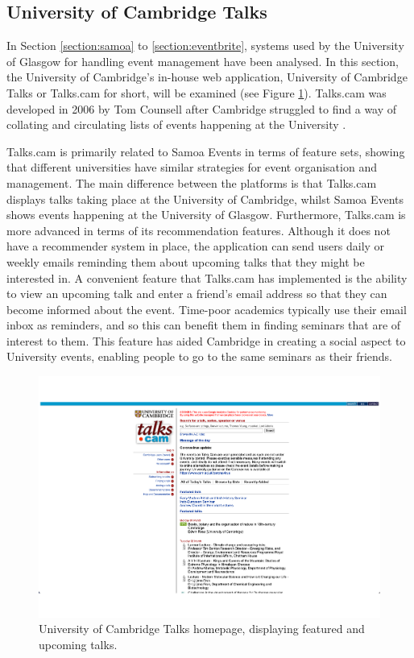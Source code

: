 \documentclass{l4proj}
\begin{document}
\subsection{University of Cambridge Talks}

In Section \ref{section:samoa} to \ref{section:eventbrite}, systems used by the University of Glasgow for handling event management have been analysed. In this section, the University of Cambridge's in-house web application, University of Cambridge Talks or Talks.cam for short, will be examined (see Figure \ref{fig:university_of_cambridge_talks}). Talks.cam was developed in 2006 by Tom Counsell after Cambridge struggled to find a way of collating and circulating lists of events happening at the University \citep{talks.camwhoarewe}.

Talks.cam is primarily related to Samoa Events in terms of feature sets, showing that different universities have similar strategies for event organisation and management. The main difference between the platforms is that Talks.cam displays talks taking place at the University of Cambridge, whilst Samoa Events shows events happening at the University of Glasgow. Furthermore, Talks.cam is more advanced in terms of its recommendation features. Although it does not have a recommender system in place, the application can send users daily or weekly emails reminding them about upcoming talks that they might be interested in. A convenient feature that Talks.cam has implemented is the ability to view an upcoming talk and enter a friend's email address so that they can become informed about the event. Time-poor academics typically use their email inbox as reminders, and so this can benefit them in finding seminars that are of interest to them. This feature has aided Cambridge in creating a social aspect to University events, enabling people to go to the same seminars as their friends.

\begin{figure}[htb]
    \centering
    \includegraphics[width=0.7\linewidth]{images/university_of_cambridge_talks.pdf}    
    \caption{University of Cambridge Talks homepage, displaying featured and upcoming talks.}
    \label{fig:university_of_cambridge_talks} 
\end{figure}
\end{document}
